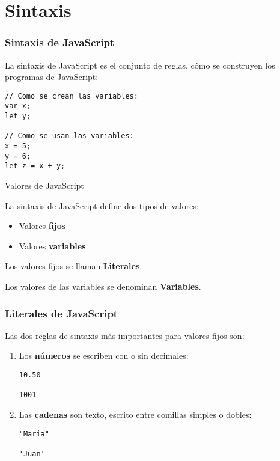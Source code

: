 
\section{Sintaxis}

\begin{frame}[fragile]
  \frametitle{Sintaxis de JavaScript}

  La sintaxis de JavaScript es el conjunto de reglas,
  cómo se construyen los programas de JavaScript:

  \vspace{\baselineskip}
  \begin{lstlisting}
// Como se crean las variables:
var x;
let y;

// Como se usan las variables:
x = 5;
y = 6;
let z = x + y;
  \end{lstlisting}
\end{frame}

\begin{frame}[c]{Valores de JavaScript}

  La sintaxis de JavaScript define dos tipos de valores:

  \begin{itemize}
    \item Valores \textbf{fijos}
    \item Valores \textbf{variables}
  \end{itemize}

  \vspace{\baselineskip}
  Los valores fijos se llaman \textbf{Literales}.

  \vspace{\baselineskip}
  Los valores de las variables se denominan \textbf{Variables}.
\end{frame}


\begin{frame}[fragile]
  \frametitle{Literales de JavaScript}

  Las dos reglas de sintaxis más importantes para valores fijos son:

  \begin{enumerate}
    \item Los \textbf{números} se escriben con o sin decimales:
          \vspace{\baselineskip}
          \begin{lstlisting}
10.50

1001
          \end{lstlisting}
    \item Las \textbf{cadenas} son texto, escrito entre comillas
          simples o dobles:
          \vspace{\baselineskip}
          \begin{lstlisting}
"Maria"

'Juan'
          \end{lstlisting}
  \end{enumerate}
\end{frame}


